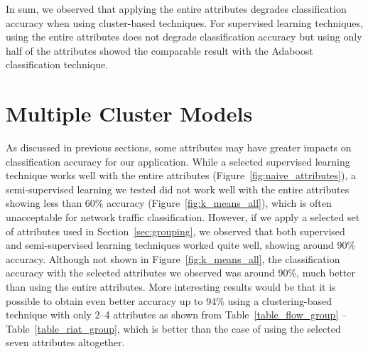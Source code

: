 \documentclass[conference]{IEEEtran}
\begin{document}


In sum, we observed that applying the entire attributes degrades classification accuracy when using cluster-based techniques.
For supervised learning techniques, using the entire attributes does not degrade classification accuracy but using only half of the attributes showed the comparable result with the Adaboost classification technique.


\section{Multiple Cluster Models}
\label{sec:multi_cluster}

As discussed in previous sections, %
some attributes may have greater impacts on classification accuracy for our application.
While a selected supervised learning technique works well with the entire attributes (Figure~\ref{fig:naive_attributes}), a semi-supervised learning we tested did not work well with the entire attributes showing less than 60\% accuracy (Figure~\ref{fig:k_means_all}), which is often unacceptable for network traffic classification.
However, if we apply a selected set of attributes used in Section~\ref{sec:grouping}, we observed that both supervised and semi-supervised learning techniques worked quite well, showing around 90\% accuracy.
Although not shown in Figure~\ref{fig:k_means_all}, the classification accuracy with the selected attributes we observed was around 90\%, much better than using the entire attributes.
More interesting results would be that it is possible to obtain even better accuracy up to 94\% using a clustering-based technique with only 2--4 attributes as shown from Table~\ref{table_flow_group} -- Table~\ref{table_riat_group}, which is better than the case of using the selected seven attributes altogether.
\end{document}
